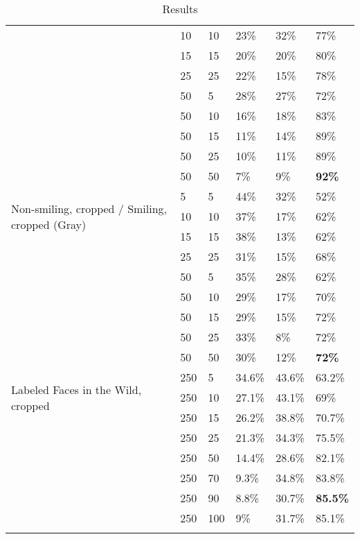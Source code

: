 \documentclass[hidelinks,11pt]{article}
\begin{document}
\begin{appendices}
\begin{longtable}{p{6em} p{5em} p{6em} p{6em} p{6em} p{6em}}
                                & 10  & 10  & 23\%  & 32\%  & 77\% \\
                                & 15  & 15  & 20\%  & 20\%  & 80\% \\
                                & 25  & 25  & 22\%  & 15\%  & 78\% \\
                                & 50  & 5   & 28\%  & 27\%  & 72\% \\
                                & 50  & 10  & 16\%  & 18\%  & 83\% \\
                                & 50  & 15  & 11\%  & 14\%  & 89\% \\
                                & 50  & 25  & 10\%  & 11\%  & 89\% \\
                                & 50  & 50  & 7\%   & 9\%   & \bfseries 92\% \\
      \midrule
      \multirow{3}{6em}{Non-smiling, cropped / Smiling, cropped (Gray)} 
                                & 5   & 5   & 44\%  & 32\%  & 52\% \\
                                & 10  & 10  & 37\%  & 17\%  & 62\% \\
                                & 15  & 15  & 38\%  & 13\%  & 62\% \\
                                & 25  & 25  & 31\%  & 15\%  & 68\% \\
                                & 50  & 5   & 35\%  & 28\%  & 62\% \\
                                & 50  & 10  & 29\%  & 17\%  & 70\% \\
                                & 50  & 15  & 29\%  & 15\%  & 72\% \\
                                & 50  & 25  & 33\%  & 8\%   & 72\% \\
                                & 50  & 50  & 30\%  & 12\%  & \bfseries 72\% \\
      \midrule
      \multirow{3}{6em}{Labeled Faces in the Wild, cropped}
                                & 250 & 5   & 34.6\%  & 43.6\%  & 63.2\% \\
                                & 250 & 10  & 27.1\%  & 43.1\%  & 69\% \\
                                & 250 & 15  & 26.2\%  & 38.8\%  & 70.7\% \\
                                & 250 & 25  & 21.3\%  & 34.3\%  & 75.5\% \\
                                & 250 & 50  & 14.4\%  & 28.6\%  & 82.1\% \\
                                & 250 & 70  & 9.3\%   & 34.8\%  & 83.8\% \\
                                & 250 & 90  & 8.8\%   & 30.7\%  & \bfseries 85.5\% \\
                                & 250 & 100 & 9\%     & 31.7\%  & 85.1\% \\
      \bottomrule
    \caption{Results}
    \label{tab:data}
  \end{longtable}

\end{appendices}

\pagebreak


\end{document}

